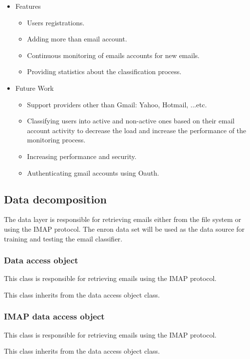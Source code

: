 \begin{itemize}
 \item Features
 \begin{itemize}
    \item Users registrations.
    \item Adding more than email account.
    \item Continuous monitoring of emails accounts for new emails.
    \item Providing statistics about the classification process.
 \end{itemize}
 \item Future Work
  \begin{itemize}
    \item Support providers other than Gmail: Yahoo, Hotmail, ...etc.
    \item Classifying users into active and non-active ones based on 
	  their email account activity to decrease the load and increase 
	  the performance of the monitoring process.
    \item Increasing performance and security.
    \item Authenticating gmail accounts using Oauth.
  \end{itemize}


\end{itemize}


\subsection{Data decomposition}
The data layer is responsible for retrieving emails either from the file system or using 
the IMAP protocol. The enron data set will be used as the data source for training and 
testing the email classifier.

\subsubsection{Data access object}
  \begin{my_desc}
   \item[Purpose] This class is responsible for retrieving emails using the IMAP protocol.
   \item[Function] This class inherits from the data access object class.
  \end{my_desc}

\subsubsection{IMAP data access object}
  \begin{my_desc}
   \item[Purpose] This class is responsible for retrieving emails using the IMAP protocol.
   \item[Function] This class inherits from the data access object class.
  \end{my_desc}



